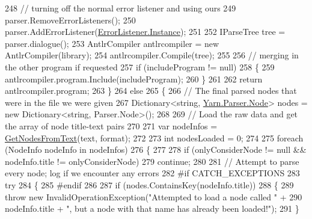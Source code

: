 \begin{DoxyCode}
248                 \textcolor{comment}{// turning off the normal error listener and using ours}
249                 parser.RemoveErrorListeners();
250                 parser.AddErrorListener(\hyperlink{a00100_a47b8f4f1d414afa1ea6067218c7ee34d}{ErrorListener.Instance});
251 
252                 IParseTree tree = parser.dialogue();
253                 AntlrCompiler antlrcompiler = \textcolor{keyword}{new} AntlrCompiler(library);
254                 antlrcompiler.Compile(tree);
255 
256                 \textcolor{comment}{// merging in the other program if requested}
257                 \textcolor{keywordflow}{if} (includeProgram != null)
258                 \{
259                     antlrcompiler.program.Include(includeProgram);
260                 \}
261 
262                 \textcolor{keywordflow}{return} antlrcompiler.program;
263             \}
264             \textcolor{keywordflow}{else}
265             \{
266                 \textcolor{comment}{// The final parsed nodes that were in the file we were given}
267                 Dictionary<string, \hyperlink{a00138}{Yarn.Parser.Node}> nodes = \textcolor{keyword}{new} Dictionary<string, 
      Parser.Node>();
268 
269                 \textcolor{comment}{// Load the raw data and get the array of node title-text pairs}
270 
271                 var nodeInfos = \hyperlink{a00133_a0aa76ba9366b44bf78198a78ea958c9c}{GetNodesFromText}(text, format);
272 
273                 \textcolor{keywordtype}{int} nodesLoaded = 0;
274 
275                 \textcolor{keywordflow}{foreach} (NodeInfo nodeInfo \textcolor{keywordflow}{in} nodeInfos)
276                 \{
277 
278                     \textcolor{keywordflow}{if} (onlyConsiderNode != null && nodeInfo.title != onlyConsiderNode)
279                         \textcolor{keywordflow}{continue};
280 
281                     \textcolor{comment}{// Attempt to parse every node; log if we encounter any errors}
282 \textcolor{preprocessor}{#if CATCH\_EXCEPTIONS}
283 \textcolor{preprocessor}{}                    \textcolor{keywordflow}{try}
284                     \{
285 \textcolor{preprocessor}{#endif}
286 \textcolor{preprocessor}{}
287                         \textcolor{keywordflow}{if} (nodes.ContainsKey(nodeInfo.title))
288                         \{
289                             \textcolor{keywordflow}{throw} \textcolor{keyword}{new} InvalidOperationException(\textcolor{stringliteral}{"Attempted to load a node called "} +
290                                 nodeInfo.title + \textcolor{stringliteral}{", but a node with that name has already been loaded!"});
291                         \}

\end{DoxyCode}
